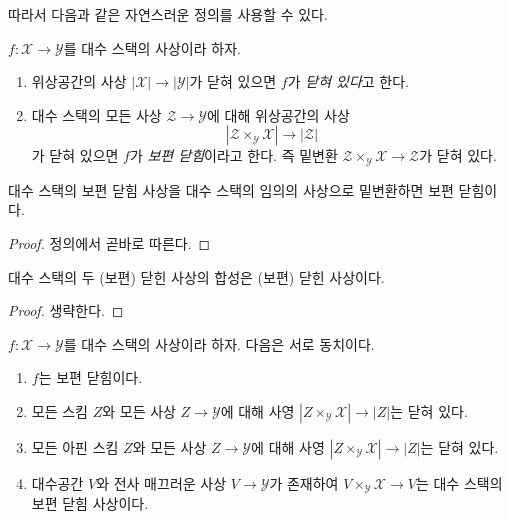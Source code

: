\noindent
따라서 다음과 같은 자연스러운 정의를 사용할 수 있다.

\begin{definition}
\label{definition-closed}
$f : \mathcal{X} \to \mathcal{Y}$를 대수 스택의 사상이라 하자.
\begin{enumerate}
\item 위상공간의 사상 $|\mathcal{X}| \to |\mathcal{Y}|$가 닫혀 있으면
$f$가 {\it 닫혀 있다}고 한다.
\item 대수 스택의 모든 사상 $\mathcal{Z} \to \mathcal{Y}$에 대해
위상공간의 사상
$$
|\mathcal{Z} \times_\mathcal{Y} \mathcal{X}| \to |\mathcal{Z}|
$$
가 닫혀 있으면 $f$가 {\it 보편 닫힘}이라고 한다. 즉 밑변환
$\mathcal{Z} \times_\mathcal{Y} \mathcal{X} \to \mathcal{Z}$가 닫혀 있다.
\end{enumerate}
\end{definition}

\begin{lemma}
\label{lemma-base-change-universally-closed}
대수 스택의 보편 닫힘 사상을 대수 스택의 임의의 사상으로 밑변환하면
보편 닫힘이다.
\end{lemma}

\begin{proof}
정의에서 곧바로 따른다.
\end{proof}

\begin{lemma}
\label{lemma-composition-universally-closed}
대수 스택의 두 (보편) 닫힌 사상의 합성은 (보편) 닫힌 사상이다.
\end{lemma}

\begin{proof}
생략한다.
\end{proof}

\begin{lemma}
\label{lemma-universally-closed-local}
$f : \mathcal{X} \to \mathcal{Y}$를 대수 스택의 사상이라 하자.
다음은 서로 동치이다.
\begin{enumerate}
\item $f$는 보편 닫힘이다.
\item 모든 스킴 $Z$와 모든 사상 $Z \to \mathcal{Y}$에 대해 사영
$|Z \times_\mathcal{Y} \mathcal{X}| \to |Z|$는 닫혀 있다.
\item 모든 아핀 스킴 $Z$와 모든 사상 $Z \to \mathcal{Y}$에 대해 사영
$|Z \times_\mathcal{Y} \mathcal{X}| \to |Z|$는 닫혀 있다.
\item 대수공간 $V$와 전사 매끄러운 사상 $V \to \mathcal{Y}$가 존재하여
$V \times_\mathcal{Y} \mathcal{X} \to V$는 대수 스택의
보편 닫힘 사상이다.
\end{enumerate}
\end{lemma}


